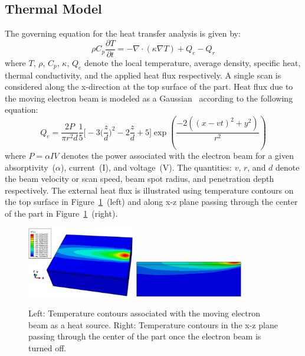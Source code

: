 \subsection{Thermal Model}
\label{sub:thermal}

The governing equation for the heat transfer analysis \cite{Zinoviev:2016} is given by:
\begin{equation}\label{eq_thermal}
\rho {C_p}\frac{{\partial T}}{{\partial t}} = -\nabla\cdot ({\kappa}\nabla T) + Q_e - Q_r 
\end{equation}
where $T$, $\rho$, $C_p$, $\kappa$, $Q_e$ denote the local temperature, average density, specific heat,  thermal 
conductivity, 
and the applied heat flux respectively. A single scan is considered along the x-direction at the top surface of the part. 
Heat flux due to the moving electron beam is modeled as a Gaussian~\cite{Vastola:2016} according to the following
equation:
%
\begin{equation}\label{eq_heatFlux}
Q_e = \frac{2P}{\pi r^2 d}\frac{1}{5}\Big[-3\Big(\frac{z}{d}\Big)^2-2\frac{z}{d}+5\Big]\exp\left({\frac{-2((x-vt)^2+y^2)}{r^2}}\right)
\end{equation}
%
where $P=\alpha IV$ denotes the power associated with the electron beam for a given absorptivity~($\alpha$),
current~(I), and voltage~(V). The quantities: $v$, $r$, and $d$ denote  the beam velocity or scan speed,
beam spot radius, and penetration depth respectively. The external heat flux is illustrated using temperature
contours on the top surface in Figure~\ref{fig:thermal}~(left) and along x-z plane passing through the center of the part in
Figure~\ref{fig:thermal}~(right). 
%
\begin{figure}[htbp]
\begin{center}
\includegraphics[width=0.42\textwidth]{./Figures/NT11Nom3D} 
\includegraphics[width=0.42\textwidth]{./Figures/NT11Nom} 
\end{center}
\caption{Left: Temperature contours associated with the moving electron beam as a heat source. Right:
Temperature contours in the x-z plane passing through the center of the part once the electron beam is 
turned off.}
\label{fig:thermal}
\end{figure}
%

